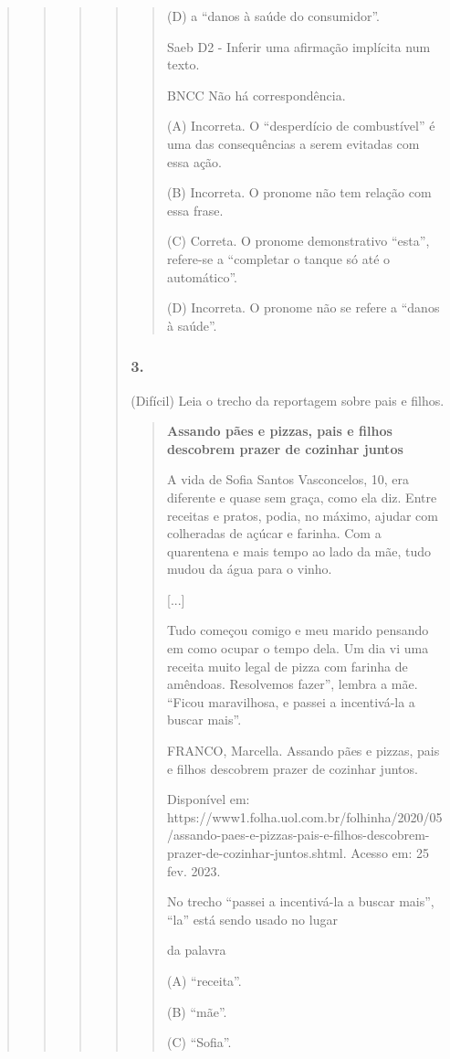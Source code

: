 \begin{quote}
\begin{quote}
\begin{quote}
\begin{quote}
\begin{quote}
(D) a ``danos à saúde do consumidor''.

Saeb D2 - Inferir uma afirmação implícita num texto.

BNCC Não há correspondência.

(A) Incorreta. O ``desperdício de combustível'' é uma das consequências
a serem evitadas com essa ação.

(B) Incorreta. O pronome não tem relação com essa frase.

(C) Correta. O pronome demonstrativo ``esta'', refere-se a ``completar o
tanque só até o automático''.

(D) Incorreta. O pronome não se refere a ``danos à saúde''.
\end{quote}

\subsubsection{3. }\label{section-79}

(Difícil) Leia o trecho da reportagem sobre pais e filhos.

\begin{quote}
\textbf{Assando pães e pizzas, pais e filhos descobrem prazer de
cozinhar juntos}

A vida de Sofia Santos Vasconcelos, 10, era diferente e quase sem graça,
como ela diz. Entre receitas e pratos, podia, no máximo, ajudar com
colheradas de açúcar e farinha. Com a quarentena e mais tempo ao lado da
mãe, tudo mudou da água para o vinho.

{[}...{]}

Tudo começou comigo e meu marido pensando em como ocupar o tempo dela.
Um dia vi uma receita muito legal de pizza com farinha de amêndoas.
Resolvemos fazer'', lembra a mãe. ``Ficou maravilhosa, e passei a
incentivá-la a buscar mais''.

FRANCO, Marcella. Assando pães e pizzas, pais e filhos descobrem prazer
de cozinhar juntos.

Disponível em:
https://www1.folha.uol.com.br/folhinha/2020/05/assando-paes-e-pizzas-pais-e-filhos-descobrem-prazer-de-cozinhar-juntos.shtml.
Acesso em: 25 fev. 2023.

No trecho ``passei a incentivá-la a buscar mais'', ``la'' está sendo
usado no lugar

da palavra

(A) ``receita''.

(B) ``mãe''.

(C) ``Sofia''.


\end{quote}
\end{quote}
\end{quote}
\end{quote}
\end{quote}
